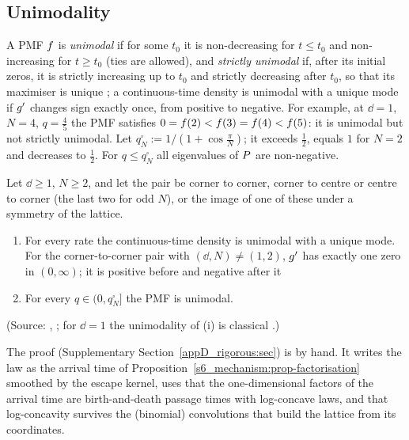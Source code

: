 \subsection{Unimodality}\label{s6b_rigorous:ssec-unimodal}

A PMF $f$ is \emph{unimodal} if for some $t_0$ it is non-decreasing for $t\le t_0$ and non-increasing for $t\ge t_0$
(ties are allowed), and \emph{strictly unimodal} if, after its initial zeros, it is strictly increasing up to $t_0$ and
strictly decreasing after $t_0$, so that its maximiser is unique ; a continuous-time density is
unimodal with a unique mode if $g'$ changes sign exactly once, from positive to negative. For example, at $\dd=1$,
$N=4$, $q=\frac45$ the PMF satisfies $0=f(2)<f(3)=f(4)<f(5)$: it is unimodal but not strictly unimodal.
Let $q_N^{\square}:=1/(1+\cos\frac\pi N)$; it exceeds $\frac12$, equals $1$ for $N=2$ and decreases to $\frac12$.
For $q\le q_N^{\square}$ all eigenvalues of $P$ are non-negative.

\begin{theorem}\label{s6b_rigorous:thm-unimodal}
Let $\dd\ge1$, $N\ge2$, and let the pair be corner to corner, corner to centre or centre to corner (the last two for
odd $N$), or the image of one of these under a symmetry of the lattice.
\begin{enumerate}
\item[(i)] For every rate the continuous-time density is unimodal with a unique mode. For the corner-to-corner pair
with $(\dd,N)\ne(1,2)$, $g'$ has exactly one zero in $(0,\infty)$; it is positive before and negative after it

\item[(ii)] For every $q\in(0,q_N^{\square}]$ the PMF is unimodal.
\end{enumerate}
\textup{(Source: , ; for $\dd=1$ the unimodality of (i) is classical
\citep{Keilson1971}.)}
\end{theorem}

The proof (Supplementary Section~\ref{appD_rigorous:sec}) is by hand. It writes the law as the arrival time of
Proposition~\ref{s6_mechanism:prop-factorisation} smoothed by the escape kernel, uses that the one-dimensional factors
of the arrival time are birth-and-death passage times with log-concave laws, and that log-concavity survives the
(binomial) convolutions that build the lattice from its coordinates.

